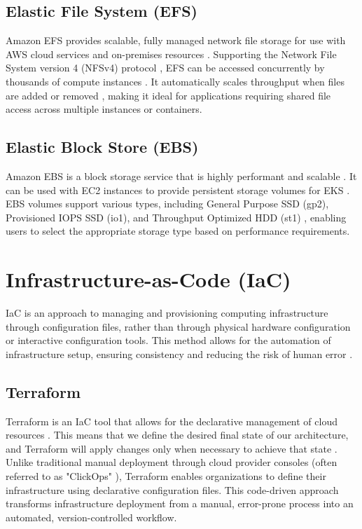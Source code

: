 \subsection{Elastic File System (EFS)}
Amazon EFS provides scalable, fully managed network file storage for use with AWS cloud services and on-premises resources \cite{efs_definition}. Supporting the Network File System version 4 (NFSv4) protocol \cite{efs_work}, EFS can be accessed concurrently by thousands of compute instances \cite{efs_performance}. It automatically scales throughput when files are added or removed \cite{efs_performance}, making it ideal for applications requiring shared file access across multiple instances or containers.

\subsection{Elastic Block Store (EBS)}
Amazon EBS is a block storage service that is highly performant and scalable \cite{ebs_definition}. It can be used with EC2 instances to provide persistent storage volumes for EKS \cite{ebs_with_eks}. EBS volumes support various types, including General Purpose SSD (gp2), Provisioned IOPS SSD (io1), and Throughput Optimized HDD (st1) \cite{ebs_types}, enabling users to select the appropriate storage type based on performance requirements.

\section{Infrastructure-as-Code (IaC)}
IaC is an approach to managing and provisioning computing infrastructure through  configuration files, rather than through physical hardware configuration or interactive configuration tools. This method allows for the automation of infrastructure setup, ensuring consistency and reducing the risk of human error \cite{iac_benefits}.

\subsection{Terraform}
Terraform is an IaC tool that allows for the declarative management of cloud resources \cite{terraform_hashicorp}. This means that we define the desired final state of our architecture, and Terraform will apply changes only when necessary to achieve that state \cite{terraform_declarative}. Unlike traditional manual deployment through cloud provider consoles (often referred to as "ClickOps" \cite{clickops}), Terraform enables organizations to define their infrastructure using declarative configuration files. This code-driven approach transforms infrastructure deployment from a manual, error-prone process into an automated, version-controlled workflow.

